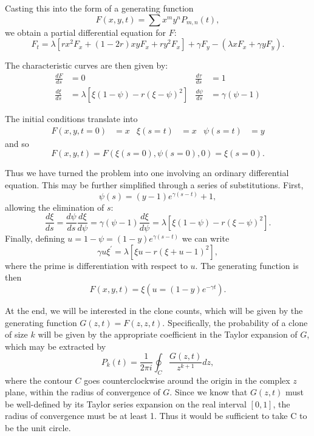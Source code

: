\documentclass[10pt,english]{article}
\begin{document}
Casting this into the form of a generating function \[F(x,y,t) = \sum x^m y^n P_{m,n}(t),\] we obtain a partial differential equation for $F$:
\begin{equation*}
F_t = \lambda \left[r x^2 F_x + (1-2r) x y F_x + r y^2 F_x\right] + \gamma F_y - (\lambda x F_x + \gamma y F_y).
\end{equation*}

The characteristic curves are then given by:
\begin{align*}
\frac{dF}{ds}&=0 & \frac{d\tau}{ds}&=1 \\
\frac{d\xi}{ds}&= \lambda\left[\xi(1-\psi) - r(\xi - \psi)^2\right] & \frac{d\psi}{ds}&= \gamma(\psi-1)
\end{align*}

The initial conditions translate into
\begin{align*}
F(x,y,t=0) &= x & \xi(s=t) &= x & \psi(s=t) &= y
\end{align*}
and so
\begin{equation*}
F\left(x,y,t\right) = F\left(\xi(s=0), \psi(s=0), 0\right) = \xi(s=0).
\end{equation*}

Thus we have turned the problem into one involving an ordinary differential equation. This may be further simplified through a series of substitutions. First, \[\psi(s) = \left(y - 1\right)e^{\gamma(s-t)}+1,\] allowing the elimination of $s$: \[\frac{d\xi}{ds} = \frac{d\psi}{ds} \frac{d\xi}{d\psi} = \gamma \left(\psi - 1\right) \frac{d\xi}{d\psi} = \lambda\left[\xi(1-\psi) - r(\xi - \psi)^2\right].\] Finally, defining $u = 1-\psi = (1-y)e^{\gamma(s-t)}$ we can write \[\gamma u \xi^\prime = \lambda \left[\xi u - r\left(\xi + u - 1\right)^2\right],\] where the prime is differentiation with respect to $u$. The generating function is then \[F(x,y,t) = \xi\left(u = (1-y)e^{-\gamma t}\right).\]

At the end, we will be interested in the clone counts, which will be given by the generating function $G(z,t) = F(z,z,t)$. Specifically, the probability of a clone of size $k$ will be given by the appropriate coefficient in the Taylor expansion of $G$, which may be extracted by \[P_k(t) = \frac{1}{2\pi i}\oint_C \frac{G(z,t)}{z^{k+1}} dz,\] where the contour $C$ goes counterclockwise around the origin in the complex $z$ plane, within the radius of convergence of $G$. Since we know that $G(z,t)$ must be well-defined by its Taylor series expansion on the real interval $[0,1]$, the radius of convergence must be at least 1. Thus it would be sufficient to take C to be the unit circle.
\end{document}
